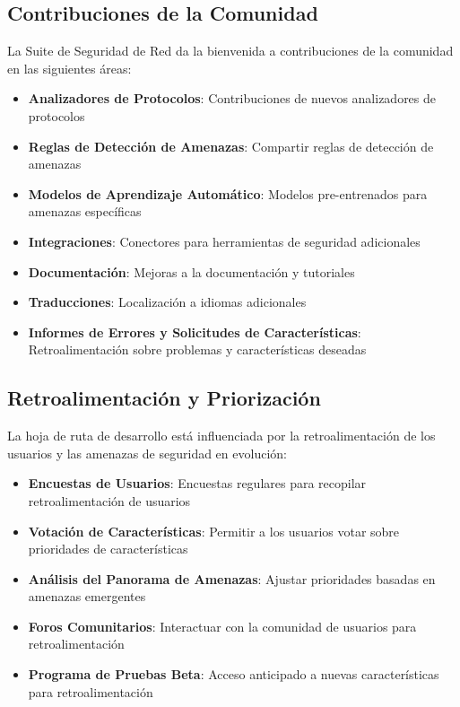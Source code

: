 \subsection{Contribuciones de la Comunidad}
La Suite de Seguridad de Red da la bienvenida a contribuciones de la comunidad en las siguientes áreas:

\begin{itemize}
    \item \textbf{Analizadores de Protocolos}: Contribuciones de nuevos analizadores de protocolos
    \item \textbf{Reglas de Detección de Amenazas}: Compartir reglas de detección de amenazas
    \item \textbf{Modelos de Aprendizaje Automático}: Modelos pre-entrenados para amenazas específicas
    \item \textbf{Integraciones}: Conectores para herramientas de seguridad adicionales
    \item \textbf{Documentación}: Mejoras a la documentación y tutoriales
    \item \textbf{Traducciones}: Localización a idiomas adicionales
    \item \textbf{Informes de Errores y Solicitudes de Características}: Retroalimentación sobre problemas y características deseadas
\end{itemize}

\subsection{Retroalimentación y Priorización}
La hoja de ruta de desarrollo está influenciada por la retroalimentación de los usuarios y las amenazas de seguridad en evolución:

\begin{itemize}
    \item \textbf{Encuestas de Usuarios}: Encuestas regulares para recopilar retroalimentación de usuarios
    \item \textbf{Votación de Características}: Permitir a los usuarios votar sobre prioridades de características
    \item \textbf{Análisis del Panorama de Amenazas}: Ajustar prioridades basadas en amenazas emergentes
    \item \textbf{Foros Comunitarios}: Interactuar con la comunidad de usuarios para retroalimentación
    \item \textbf{Programa de Pruebas Beta}: Acceso anticipado a nuevas características para retroalimentación
\end{itemize}

